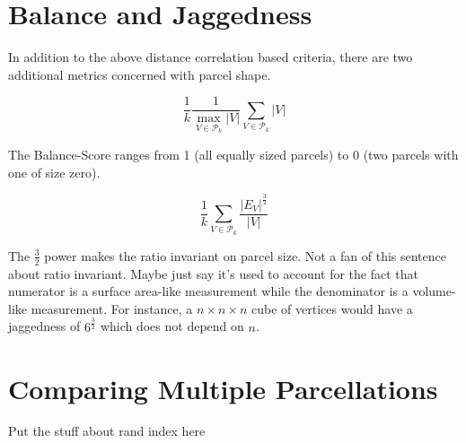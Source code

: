\section{Balance and Jaggedness}

In addition to the above distance correlation based criteria, there are
two additional metrics concerned with parcel shape.

\begin{definition}[Balance] \label{balance}
\[ \frac{1}{k} \frac{1}{\max_{V \in \mathcal{P}_k} |V|}
   \sum_{V \in \mathcal{P}_k} |V| \]
\end{definition}

The Balance-Score ranges from 1 (all equally sized parcels) to
0 (two parcels with one of size zero).

\begin{definition}[Jaggedness] \label{jaggedness}
\[ \frac{1}{k} \sum_{V \in \mathcal{P}_k} \frac{|E_V|^\frac{3}{2}}{|V|}
\]
\end{definition}

The $\frac{3}{2}$ power makes the ratio invariant on parcel size. 
{\color{red}Not a fan of this sentence about ratio invariant. Maybe just
say it's used to account for the fact that numerator is a surface area-like
measurement while the denominator is a volume-like measurement.}
For instance, a $n \times n \times n$ cube of vertices would have
a jaggedness of $6^{\frac{3}{2}}$ which does not depend on $n$.

\section{Comparing Multiple Parcellations}

{\color{red}Put the stuff about rand index here}

